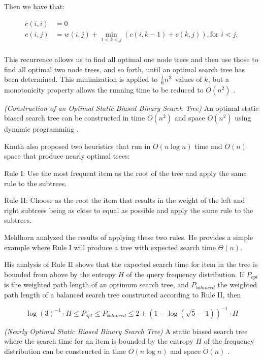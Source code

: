 \documentclass[mcs]{scsthesis}
\begin{document}
Then we have that:

\begin{equation}
    \begin{aligned}
    c(i, i) & = 0 \\
    c(i, j) & = w(i, j) + \min_{1<k<j} (c(i, k - 1) + c(k, j)), \text{for } i<j, \\
    \end{aligned}
\end{equation}

This recurrence allows us to find all optimal one node trees and then use those
to find all optimal two node trees, and so forth, until an optimal search
tree has been determined. This minimization is applied to \({1\over{6}} n^{3} \)
values of \( k \), but a monotonicity property allows the running time to be
reduced to \( O(n^2) \) \cite{knuth}.

\begin{thm} \emph{(Construction of an Optimal Static Biased Binary Search Tree)} 
An optimal static biased search tree can be constructed in time \(O(n^2)\) and
space \(O(n^2)\) using dynamic programming \cite{knuth}.
\end{thm}

Knuth also proposed two heuristics that run in \(O(n \log n)\) time and
\(O(n)\) space that produce nearly optimal trees:

Rule I: Use the most frequent item as the root of the tree and apply the same
rule to the subtrees.

Rule II: Choose as the root the item that results in the weight of the left
and right subtrees being as close to equal as possible and apply the same
rule to the subtrees. 

Mehlhorn \cite{mehlhorn} analyzed the results of applying these two rules. He
provides a simple example where Rule I will produce a tree with expected
search time \(\Theta(n)\).

His analysis of Rule II shows that the expected search time for item in the tree
is bounded from above by the entropy \(H\) of the query frequency distribution.
If $P_{opt}$ is the weighted path length of an optimum search tree, and
$P_{balanced}$ the weighted path length of a balanced search tree constructed
according to Rule II, then

$$
{\log(3)}^{-1} \cdot H \le P_{opt} \le P_{balanced} \le 2 + {(1 - \log(\sqrt 5 - 1))}^{-1} \cdot H
$$

\begin{thm} \emph{(Nearly Optimal Static Biased Binary Search Tree)} 
A static biased search tree where the search time for an item is bounded by
the entropy \(H\) of the frequency distribution can be constructed in time
\(O(n \log n)\) and space \(O(n)\) \cite{mehlhorn}.
\end{thm}
\end{document}
